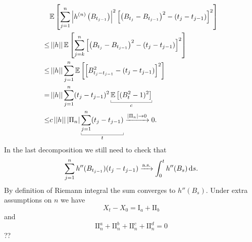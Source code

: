 \documentclass[12pt]{report}
\begin{document}
\begin{fancyproof}
\begin{enumerate}
\begin{align*}
		&\ev{\sum_{j=1}^{n}\left|h^{(n)}\left(B_{t_{j-1}}\right)\right|^{2}\left[\left(B_{t_{j}}-B_{t_{j-1}}\right)^{2}-\left(t_{j}-t_{j-1}\right)\right]^{2}}\\
		\leq&\norm{h}\ev{\sum_{j=k}^{n}\left[\left(B_{t_{j}}-B_{t_{j-1}}\right)^{2}-\left(t_{j}-t_{j-1}\right)\right]^{2}}\\
		\leq&\norm{h}\sum_{j=1}^{n}\ev{\left[B^{2}_{t_{j}-t_{j-1}}-(t_{j}-t_{j-1})\right]^{2}}\\
		=&\norm{h}\sum_{j=1}^{n}(t_{j}-t_{j-1})^{2}\ubracketthin{\ev{(B^{2}_{t}-1)^{2}}}_{c}\\
		\leq&c\norm{h}|\Pi_{n}|\ubracketthin{\sum_{j=1}^{n}(t_{j}-t_{j-1})}_{t}\xrightarrow{|\Pi_{n}|\to0}0.
	\end{align*}
	In the last decomposition we still need to check that
	\begin{equation*}
		\sum_{j=1}^{n}h''(B_{t_{j-1}})(t_{j}-t_{j-1})\xrightarrow[]{\text{a.s.}}\int_{0}^{t}h''(B_{s})\mathop{}\!\mathrm{d} s.
	\end{equation*}
	By definition of Riemann integral the sum converges to $h''(B_{s})$. Under extra assumptions on $n$ we have
	\begin{equation*}
		X_{t}-X_{0}=\mathrm{I}_{a}+\mathrm{II}_{b}
	\end{equation*}
	and
	\begin{equation*}
		\mathrm{II}_{n}^{a}+\mathrm{II}_{n}^{b}+\mathrm{II}_{n}^{c}+\mathrm{II}_{n}^{d}=0
	\end{equation*}
	??
\end{enumerate}
\end{fancyproof}
\end{document}
